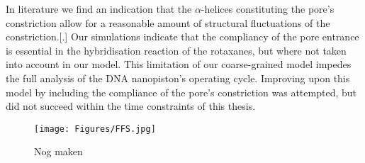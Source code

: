 In literature we find an indication that the $\alpha$-helices constituting the pore's
constriction allow for a reasonable amount of structural fluctuations of the
constriction.[.]
Our simulations indicate that the compliancy of the pore entrance is essential in the
hybridisation reaction of the rotaxanes, but where not taken into account in our model.
This limitation of our coarse-grained model impedes the full analysis of the DNA
nanopiston's operating cycle. Improving upon this model by including the compliance of
the pore's constriction was attempted, but did not succeed within the time constraints of
this thesis.

\begin{figure}[ht!]
  \centering
  \texttt{[image: Figures/FFS.jpg]}
  \caption{Nog maken}
\end{figure}

